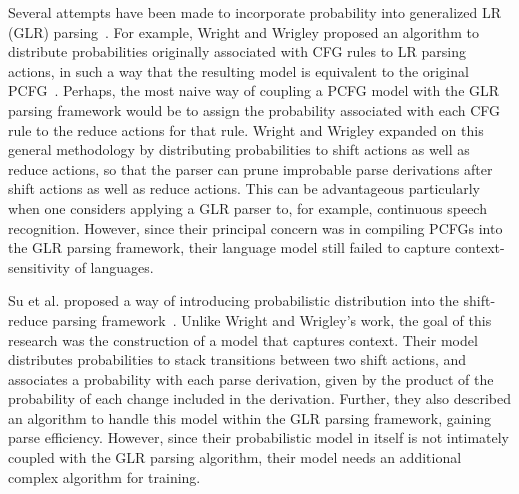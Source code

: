 \documentclass[a4j]{article}
\begin{document}
Several attempts have been made to incorporate probability into
generalized LR (GLR) parsing~\cite{tomita:86:a}. For example, Wright and
Wrigley proposed an algorithm to distribute probabilities originally
associated with CFG rules to LR parsing actions, in such a way that the
resulting model is equivalent to the original
PCFG~\cite{wright:91:a}. Perhaps, the most naive way of coupling a PCFG
model with the GLR parsing framework would be to assign the probability
associated with each CFG rule to the reduce actions for that
rule. Wright and Wrigley expanded on this general methodology by
distributing probabilities to shift actions as well as reduce actions,
so that the parser can prune improbable parse derivations after shift
actions as well as reduce actions. This can be advantageous particularly
when one considers applying a GLR parser to, for example, continuous
speech recognition. However, since their principal concern was in
compiling PCFGs into the GLR parsing framework, their language model
still failed to capture context-sensitivity of languages.

Su et al. proposed a way of introducing probabilistic distribution into
the shift-reduce parsing framework~\cite{su:91:a}. Unlike Wright and
Wrigley's work, the goal of this research was the construction of a
model that captures context.
Their model distributes
probabilities to stack transitions between two shift actions, and
associates a probability with each parse derivation, given by the
product of the probability of each change included in the
derivation. Further, they also described an algorithm to handle this
model within the GLR parsing framework, gaining parse
efficiency. However, since their probabilistic model in itself is not
intimately coupled with the GLR parsing algorithm, their model needs an
additional complex algorithm for training.
\end{document}
